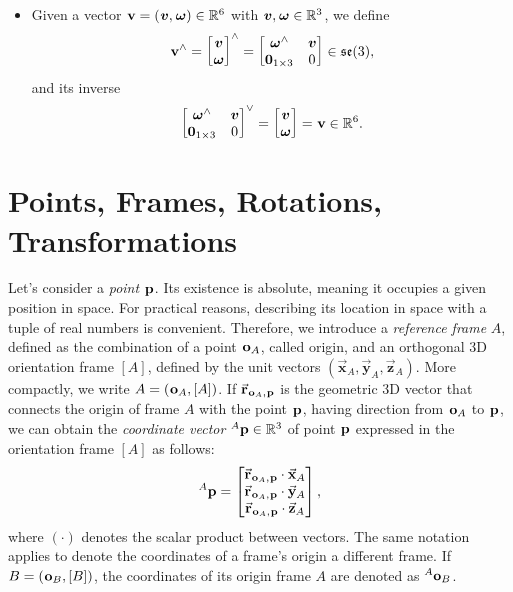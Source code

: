 \begin{itemize}
\item
Given a vector $\velsix = (\vellin, \velang) \in \realn^6$ with $\vellin, \velang \in \realn^3$, we define
%
\begin{equation*}
    \velsix^\wedge 
    = \begin{bmatrix} \vellin \\ \velang \end{bmatrix}^\wedge
    = \begin{bmatrix} \velang^\wedge & \vellin \\ \zeros_{1\times3} & 0 \end{bmatrix}
    \in \se(3)
    ,
\end{equation*}
%
and its inverse
%
\begin{equation*}
    \begin{bmatrix} \velang^\wedge & \vellin \\ \zeros_{1\times3} & 0 \end{bmatrix}^\vee
    = \begin{bmatrix} \vellin \\ \velang \end{bmatrix}
    = \velsix \in \realn^6
    .
\end{equation*}
%
\end{itemize}

\pagebreak
\section{Points, Frames, Rotations, Transformations}

Let's consider a \emph{point} $\pos$.
Its existence is absolute, meaning it occupies a given position in space.
For practical reasons, describing its location in space with a tuple of real numbers is convenient.
Therefore, we introduce a \emph{reference frame} $A$, defined as the combination of a point $\ori_A$, called origin, and an orthogonal 3D orientation frame $[A]$, defined by the unit vectors $(\vec{\mathbf{x}}_A, \vec{\mathbf{y}}_A, \vec{\mathbf{z}}_A)$.
More compactly, we write $A = (\ori_A, [A])$.
If $\vec{\mathbf{r}}_{\ori_A, \pos}$ is the geometric 3D vector that connects the origin of frame $A$ with the point $\pos$, having direction from $\ori_A$ to $\pos$, we can obtain the \emph{coordinate vector} $\pos[A] \in \realn^3$ of point $\pos$ expressed in the orientation frame $[A]$ as follows:
%
\begin{equation*}
    \pos[A] =
    \begin{bmatrix}
        \vec{\mathbf{r}}_{\ori_A, \pos} \cdot \vec{\mathbf{x}}_A \\
        \vec{\mathbf{r}}_{\ori_A, \pos} \cdot \vec{\mathbf{y}}_A \\
        \vec{\mathbf{r}}_{\ori_A, \pos} \cdot \vec{\mathbf{z}}_A
    \end{bmatrix}
    ,
\end{equation*}
%
where $(\cdot)$ denotes the scalar product between vectors.
The same notation applies to denote the coordinates of a frame's origin \wrt a different frame.
If $B = (\ori_B, [B])$, the coordinates of its origin \wrtl frame $A$ are denoted as $\ori[A]_B$.

